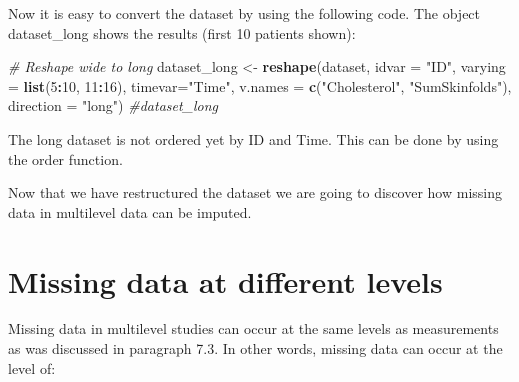 \documentclass[]{book}
\newenvironment{Shaded}{\begin{snugshade}}{\end{snugshade}}
\newcommand{\KeywordTok}[1]{\textcolor[rgb]{0.13,0.29,0.53}{\textbf{#1}}}
\newcommand{\DataTypeTok}[1]{\textcolor[rgb]{0.13,0.29,0.53}{#1}}
\newcommand{\DecValTok}[1]{\textcolor[rgb]{0.00,0.00,0.81}{#1}}
\newcommand{\StringTok}[1]{\textcolor[rgb]{0.31,0.60,0.02}{#1}}
\newcommand{\CommentTok}[1]{\textcolor[rgb]{0.56,0.35,0.01}{\textit{#1}}}
\newcommand{\OperatorTok}[1]{\textcolor[rgb]{0.81,0.36,0.00}{\textbf{#1}}}
\newcommand{\NormalTok}[1]{#1}
\theoremstyle{definition}
\theoremstyle{definition}
\theoremstyle{definition}
\theoremstyle{remark}
\begin{document}
Now it is easy to convert the dataset by using the following code. The
object dataset\_long shows the results (first 10 patients shown):

\begin{Shaded}
\begin{Highlighting}[]
\CommentTok{# Reshape wide to long}
\NormalTok{dataset_long <-}\StringTok{ }\KeywordTok{reshape}\NormalTok{(dataset, }\DataTypeTok{idvar =} \StringTok{"ID"}\NormalTok{, }\DataTypeTok{varying =} \KeywordTok{list}\NormalTok{(}\DecValTok{5}\OperatorTok{:}\DecValTok{10}\NormalTok{, }\DecValTok{11}\OperatorTok{:}\DecValTok{16}\NormalTok{), }\DataTypeTok{timevar=}\StringTok{"Time"}\NormalTok{, }
         \DataTypeTok{v.names =} \KeywordTok{c}\NormalTok{(}\StringTok{"Cholesterol"}\NormalTok{, }\StringTok{"SumSkinfolds"}\NormalTok{), }\DataTypeTok{direction =} \StringTok{"long"}\NormalTok{)}
\CommentTok{#dataset_long}
\end{Highlighting}
\end{Shaded}

The long dataset is not ordered yet by ID and Time. This can be done by
using the order function.

\begin{Shaded}
\end{Shaded}

Now that we have restructured the dataset we are going to discover how
missing data in multilevel data can be imputed.

\section{Missing data at different
levels}\label{missing-data-at-different-levels}

Missing data in multilevel studies can occur at the same levels as
measurements as was discussed in paragraph 7.3. In other words, missing
data can occur at the level of:
\end{document}
